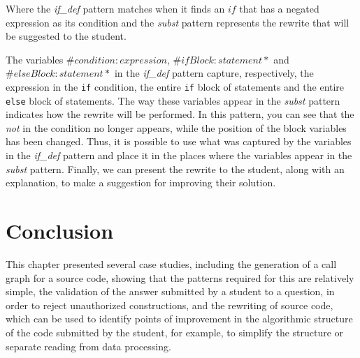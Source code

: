 Where the \textit{if\_def} pattern matches when it finds an \(if\) that has a 
negated expression as its condition and the \textit{subst} pattern represents 
the rewrite that will be suggested to the student.

The variables \(\#condition:expression\), \(\#ifBlock:statement*\) and \(\#elseBlock:statement*\)
in the \textit{if\_def} pattern capture, respectively, the expression in the
\texttt{if} condition, the entire \texttt{if} block of statements and the entire
\texttt{else} block of statements.
The way these variables appear in the \textit{subst} pattern indicates how the
rewrite will be performed. In this pattern, you can see that the \textit{not}
in the condition no longer appears, while the position of the block variables
has been changed. Thus, it is possible to use what was captured by the variables
in the \textit{if\_def} pattern and place it in the places where the variables
appear in the \textit{subst} pattern.
Finally, we can present the rewrite to the student, along with an explanation, to
make a suggestion for improving their solution.

\section{Conclusion}\label{sec:results-conclusion}

This chapter presented several case studies, including the generation of a call 
graph for a source code, showing that the patterns required for this are relatively 
simple, the validation of the answer submitted by a student to a question, in 
order to reject unauthorized constructions, and the rewriting of source code, 
which can be used to identify points of improvement in the algorithmic structure 
of the code submitted by the student, for example, to simplify the structure or 
separate reading from data processing.

\cleardoublepage
